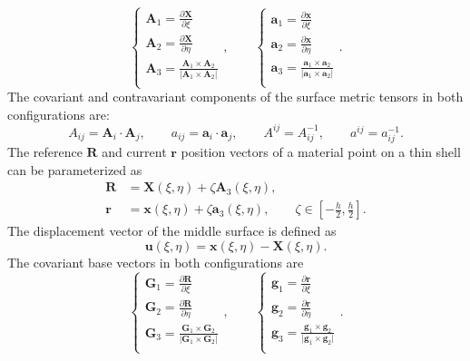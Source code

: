 \documentclass[preprint,12pt]{elsarticle}
\theoremstyle{remark}
\begin{document}
\begin{equation}
    \begin{cases}
        \mathbf{A}_1 = \frac{\partial\mathbf{X}}{\partial\xi} \\
        \mathbf{A}_2 = \frac{\partial\mathbf{X}}{\partial\eta} \\
        \mathbf{A}_3 = \frac{\mathbf{A}_1\times\mathbf{A}_2}{\vert{\mathbf{A}_1\times\mathbf{A}_2}\vert} \\
    \end{cases},\qquad
    \begin{cases}
        \mathbf{a}_1 = \frac{\partial\mathbf{x}}{\partial\xi} \\
        \mathbf{a}_2 = \frac{\partial\mathbf{x}}{\partial\eta} \\
        \mathbf{a}_3 = \frac{\mathbf{a}_1\times\mathbf{a}_2}{\vert{\mathbf{a}_1\times\mathbf{a}_2}\vert} \\
    \end{cases}.    
\end{equation}
The covariant and contravariant components of the surface metric tensors in both configurations are:
\begin{equation}
    A_{ij}=\mathbf{A}_i\cdot\mathbf{A}_j, \qquad {}a_{ij}=\mathbf{a}_i\cdot\mathbf{a}_j, \qquad {} A^{ij}=A_{ij}^{-1}, \qquad {}a^{ij}=a_{ij}^{-1}.
\end{equation}
The reference $\mathbf{R}$ and current $\mathbf{r}$ position vectors of a material point on a thin shell can be parameterized as
\begin{align}
    \mathbf{R} &= \mathbf{X}(\xi, \eta) +\zeta\mathbf{A}_3(\xi, \eta),\\
    \mathbf{r} &= \mathbf{x}(\xi, \eta) +\zeta\mathbf{a}_3(\xi, \eta),\qquad\zeta\in\left[{-\frac{h}{2}, \frac{h}{2}}\right].
\end{align}
The displacement vector of the middle surface is defined as
\begin{equation}
    \mathbf{u}(\xi, \eta) = \mathbf{x}(\xi, \eta) - \mathbf{X}(\xi, \eta).
\end{equation}
The covariant base vectors in both configurations are
\begin{equation}
    \begin{cases}
        \mathbf{G}_1 = \frac{\partial\mathbf{R}}{\partial\xi} \\
        \mathbf{G}_2 = \frac{\partial\mathbf{R}}{\partial\eta} \\
        \mathbf{G}_3 = \frac{\mathbf{G}_1\times\mathbf{G}_2}{\vert{\mathbf{G}_1\times\mathbf{G}_2}\vert} \\
    \end{cases},\qquad
    \begin{cases}
        \mathbf{g}_1 = \frac{\partial\mathbf{r}}{\partial\xi} \\
        \mathbf{g}_2 = \frac{\partial\mathbf{r}}{\partial\eta} \\
        \mathbf{g}_3 = \frac{\mathbf{g}_1\times\mathbf{g}_2}{\vert{\mathbf{g}_1\times\mathbf{g}_2}\vert} \\
    \end{cases}.    
\end{equation}
\end{document}
